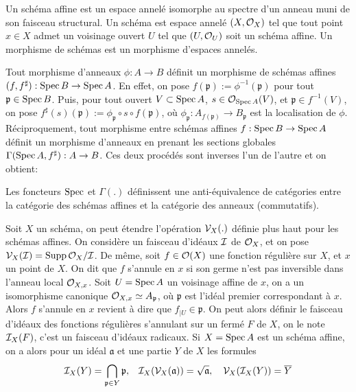\begin{defn}
Un schéma affine est un espace annelé isomorphe au spectre d'un anneau muni de son faisceau structural. Un schéma est espace annelé $(X,\mathcal{O}_X)$ tel que tout point $x\in X$ admet un voisinage ouvert $U$ tel que $(U,\mathcal{O}_U)$ soit un schéma affine. Un morphisme de schémas est un morphisme d'espaces annelés.
\end{defn}

Tout morphisme d'anneaux $\phi:A\rightarrow B$ définit un morphisme de schémas affines $(f,f^\sharp):\operatorname{Spec} B\rightarrow\operatorname{Spec} A$. En effet, on pose $f(\mathfrak{p}):=\phi^{-1}(\mathfrak{p})$ pour tout $\mathfrak{p}\in \operatorname{Spec} B$. Puis, pour tout ouvert $V\subset \operatorname{Spec} A$, $s\in\mathcal{O}_{\operatorname{Spec} A}(V)$, et $\mathfrak{p}\in f^{-1}(V)$, on pose $f^\sharp(s)(\mathfrak{p}):=\phi_{\mathfrak{p}}\circ s \circ f(\mathfrak{p})$, où $\phi_{\mathfrak{p}}:A_{f(\mathfrak{p})}\rightarrow B_{\mathfrak{p}}$ est la localisation de $\phi$.
Réciproquement, tout morphisme entre schémas affines $f:\operatorname{Spec} B\rightarrow \operatorname{Spec} A$ définit un morphisme d'anneaux en prenant les sections globales $\Gamma(\operatorname{Spec} A, f^\sharp):A\rightarrow B$. Ces deux procédés sont inverses l'un de l'autre et on obtient:


\begin{prop}\label{EqCat}
Les foncteurs $\operatorname{Spec}$ et $\Gamma(.)$ définissent une anti-équivalence de catégories entre la catégorie des schémas affines et la catégorie des anneaux (commutatifs).
\end{prop}

Soit $X$ un schéma, on peut étendre l'opération $\mathcal{V}_X(.)$ définie plus haut pour les schémas affines. On considère un faisceau d'idéaux $\mathcal{I}$ de $\mathcal{O}_X$, et on pose $\mathcal{V}_X(\mathcal{I})=\operatorname{Supp} \mathcal{O}_X/\mathcal{I}$. De même, soit $f\in \mathcal{O}(X)$ une fonction régulière sur $X$, et $x$ un point de $X$. On dit que $f$ s'annule en $x$ si son germe n'est pas inversible dans l'anneau local $\mathcal{O}_{X,x}$. Soit $U=\operatorname{Spec} A$ un voisinage affine de $x$, on a un isomorphisme canonique $\mathcal{O}_{X,x}\simeq A_\mathfrak{p}$, où $\mathfrak{p}$ est l'idéal premier correspondant à $x$. Alors $f$ s'annule en $x$ revient à dire que $f_{|U}\in \mathfrak{p}$. On peut alors définir le faisceau d'idéaux des fonctions régulières s'annulant sur un fermé $F$ de $X$, on le note $\mathcal{I}_X(F)$, c'est un faisceau d'idéaux radicaux. Si $X=\operatorname{Spec} A$ est un schéma affine, on a alors pour un idéal $\mathfrak{a}$ et une partie $Y$ de $X$ les formules
$$\mathcal{I}_X(Y)=\bigcap_{\mathfrak{p}\in Y}\mathfrak{p},\,\,\,\,\, \mathcal{I}_X(\mathcal{V}_X(\mathfrak{a}))=\sqrt{\mathfrak{a}},\,\,\,\,\,\,\mathcal{V}_X(\mathcal{I}_X(Y))=\overline{Y}$$


